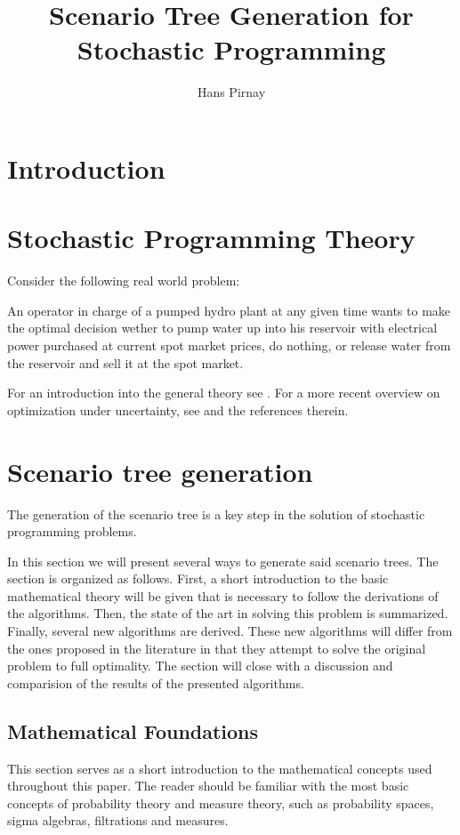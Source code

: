 \documentclass[a4paper, 12pt] {article}
\begin{document}
\listoftodos
\newpage
\title{Scenario Tree Generation for Stochastic Programming}
\author{Hans Pirnay}
\maketitle
\tableofcontents
\newpage
\section{Introduction}
\section{Stochastic Programming Theory}
Consider the following real world problem:

An operator in charge of a pumped hydro plant at any given time wants to make the optimal decision wether to pump water up into his reservoir with electrical power purchased at current spot market prices, do nothing, or release water from the reservoir and sell it at the spot market. 

For an introduction into the general theory see \cite{Birge1997}. For a more recent overview on optimization under uncertainty, see \cite{Sahinidis2004} and the references therein.
\section{Scenario tree generation}
The generation of the scenario tree is a key step in the solution of stochastic programming problems.

In this section we will present several ways to generate said scenario trees. The section is organized as follows. First, a short introduction to the basic mathematical theory will be given that is necessary to follow the derivations of the algorithms. Then, the state of the art in solving this problem is summarized. Finally, several new algorithms are derived. These new algorithms will differ from the ones proposed in the literature in that they attempt to solve the original problem to full optimality. The section will close with a discussion and comparision of the results of the presented algorithms. 
\subsection{Mathematical Foundations}
This section serves as a short introduction to the mathematical concepts used throughout this paper. The reader should be familiar with the most basic concepts of probability theory and measure theory, such as probability spaces, sigma algebras, filtrations and measures.
\end{document}
